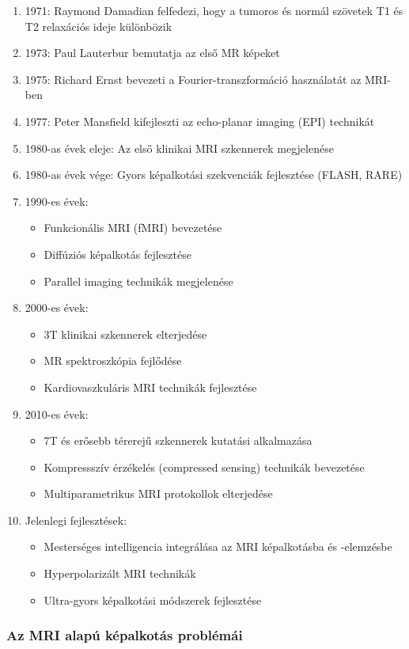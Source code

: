 \documentclass[a4paper,12pt]{article}
\begin{document}
\begin{enumerate}
\item 1971: Raymond Damadian felfedezi, hogy a tumoros és normál szövetek T1 és T2 relaxációs ideje különbözik \item 1973: Paul Lauterbur bemutatja az első MR képeket \item 1975: Richard Ernst bevezeti a Fourier-transzformáció használatát az MRI-ben \item 1977: Peter Mansfield kifejleszti az echo-planar imaging (EPI) technikát \item 1980-as évek eleje: Az első klinikai MRI szkennerek megjelenése \item 1980-as évek vége: Gyors képalkotási szekvenciák fejlesztése (FLASH, RARE) \item 1990-es évek: \begin{itemize} \item Funkcionális MRI (fMRI) bevezetése \item Diffúziós képalkotás fejlesztése \item Parallel imaging technikák megjelenése \end{itemize} \item 2000-es évek: \begin{itemize} \item 3T klinikai szkennerek elterjedése \item MR spektroszkópia fejlődése \item Kardiovaszkuláris MRI technikák fejlesztése \end{itemize} \item 2010-es évek: \begin{itemize} \item 7T és erősebb térerejű szkennerek kutatási alkalmazása \item Kompressszív érzékelés (compressed sensing) technikák bevezetése \item Multiparametrikus MRI protokollok elterjedése \end{itemize} \item Jelenlegi fejlesztések: \begin{itemize} \item Mesterséges intelligencia integrálása az MRI képalkotásba és -elemzésbe \item Hyperpolarizált MRI technikák \item Ultra-gyors képalkotási módszerek fejlesztése \end{itemize}
\end{enumerate}

\subsubsection{Az MRI alapú képalkotás problémái}
\end{document}
